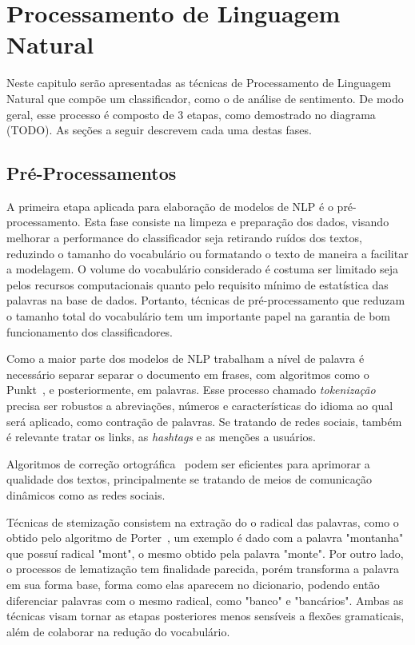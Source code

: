 \chapter{Processamento de Linguagem Natural}
\label{chapter:nlp}

Neste capitulo serão apresentadas as técnicas de Processamento de Linguagem
Natural que compõe um classificador, como o de análise de sentimento.
De modo geral, esse processo é composto de 3 etapas, como demostrado no diagrama
(TODO).
As seções a seguir descrevem cada uma destas fases.

\section{Pré-Processamentos}

A primeira etapa aplicada para elaboração de modelos de NLP é o
pré-processamento.
Esta fase consiste na limpeza e preparação dos dados, visando melhorar a
performance do classificador seja retirando ruídos dos textos, reduzindo o
tamanho do vocabulário ou formatando o texto de maneira a facilitar a modelagem.
O volume do vocabulário considerado é costuma ser limitado seja pelos recursos
computacionais quanto pelo requisito mínimo de estatística das palavras na base
de dados.
Portanto, técnicas de pré-processamento que reduzam o tamanho total do
vocabulário tem um importante papel na garantia de bom funcionamento dos
classificadores.

Como a maior parte dos modelos de NLP trabalham a nível de palavra é necessário
separar separar o documento em frases, com algoritmos como o Punkt~\cite{kiss06},
e posteriormente, em palavras.
Esse processo chamado \textit{tokenização} precisa ser robustos a abreviações,
números e características do idioma ao qual será aplicado, como contração de
palavras.
Se tratando de redes sociais, também é relevante tratar os links, as
\textit{hashtags} e as menções a usuários.

Algoritmos de correção ortográfica~\cite{damerau64}\cite{navarro01} podem ser
eficientes para aprimorar a qualidade dos textos, principalmente se tratando de
meios de comunicação dinâmicos como as redes sociais.

Técnicas de stemização consistem na extração do o radical das palavras,
como o obtido pelo algoritmo de Porter~\cite{porter80}, um exemplo é dado com a
palavra "montanha" que possuí radical "mont", o mesmo obtido pela palavra
"monte".
Por outro lado, o processos de lematização tem finalidade parecida, porém
transforma a palavra em sua forma base, forma como elas aparecem no dicionario,
podendo então diferenciar palavras com o mesmo radical, como "banco" e "bancários".
Ambas as técnicas visam tornar as etapas posteriores menos sensíveis a flexões
gramaticais, além de colaborar na redução do vocabulário.

